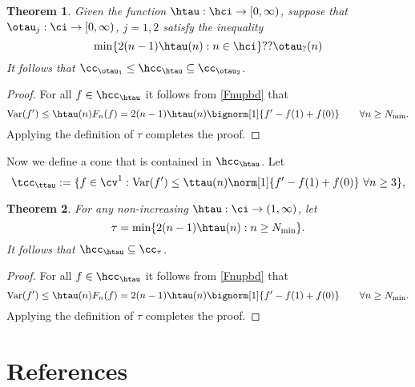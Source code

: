 \documentclass[]{elsarticle}
\DeclareMathOperator{\Var}{Var}
\newtheorem{theorem}{Theorem}
\theoremstyle{definition}
\theoremstyle{remark}
\begin{document}
\begin{theorem}  Given the function $\htau: \hci \to [0,\infty)$, suppose that $\otau_j : \ci \to [0,\infty)$, $j=1,2$ satisfy the inequality
\begin{equation} \label{inequalbar}
\min\{ 2(n-1) \htau(n) : n \in \hci  \} ?? \otau_?(n) 
\end{equation}
It follows that $\cc_{\otau_1} \le \hcc_{\htau} \subseteq \cc_{\otau_2}$.  
\end{theorem}
\begin{proof}  For all $f \in \hcc_{\htau}$ it follows from \eqref{Fnupbd} that
\begin{equation*}
\Var(f') \le \htau(n) F_n(f) = 2(n-1) \htau(n) \bignorm[1]{f'-f(1)+f(0)} \qquad \forall n \ge N_{\min}. 
\end{equation*}
Applying the definition of $\tau$ completes the proof.
\end{proof}

Now we define a cone that is contained in $\hcc_{\htau}$.  Let 
\begin{equation}\label{smallconeinteg}
\tcc_{\ttau}:=\{f\in \cv^{1}:\Var(f')\leq\ttau(n)\norm[1]{f'-f(1)+f(0)} \ \forall n\ge 3  \},
\end{equation}



\begin{theorem}  For any non-increasing $\htau: \ci \to (1,\infty)$, let  
\[
\tau = \min\{ 2(n-1) \htau(n) : n \ge  N_{\min}  \}.
\]
It follows that $\hcc_{\htau} \subseteq \cc_{\tau}$.  
\end{theorem}
\begin{proof}  For all $f \in \hcc_{\htau}$ it follows from \eqref{Fnupbd} that
\begin{equation*}
\Var(f') \le \htau(n) F_n(f) = 2(n-1) \htau(n) \bignorm[1]{f'-f(1)+f(0)} \qquad \forall n \ge N_{\min}. 
\end{equation*}
Applying the definition of $\tau$ completes the proof.
\end{proof}


\section*{References}

%

\end{document}
